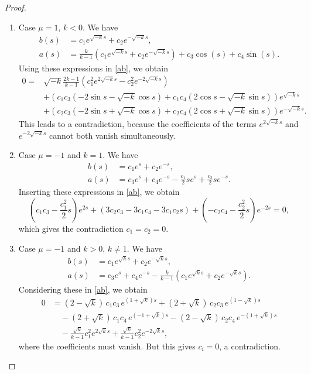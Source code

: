 \documentclass[10pt,a4paper]{amsart}
\begin{document}
\begin{proof}
\begin{enumerate}
\begin{enumerate}
\begin{enumerate}
\item Case $\mu=1$, $k <0$. We have 
\begin{equation*}
\begin{split}
b(s)&=c_1e^{\sqrt{-k}s}+c_2 e^{-\sqrt{-k}s},\\ 
a(s)&=\frac{k }{k-1}(c_1 e^{\sqrt{-k} s}+c_2 e^{-\sqrt{-k} s})+c_3 \cos (s)+c_4 \sin (s).
\end{split}
\end{equation*}
Using these expressions in \eqref{ab}, we obtain 
$$
\begin{aligned}
0=&
\sqrt{-k}\frac{2k-1}{k-1}( c_1^{2} e^{2\sqrt{-k}s}-c_2^{2} e^{-2\sqrt{-k}s}) \\
&+(c_1c_3(-2\sin s - \sqrt{-k}\cos s)+c_1c_4(2\cos s - \sqrt{-k}\sin s)) e^{\sqrt{-k}s} \\
&+(c_2c_3(-2\sin s +\sqrt{-k}\cos s)+c_2c_4(2\cos s + \sqrt{-k}\sin s))e^{-\sqrt{-k}s}.
\end{aligned}
$$
This leads to a contradiction, because the coefficients of the terms $e^{2\sqrt{-k}s}$ and $e^{-2\sqrt{-k}s}$ cannot both vanish simultaneously.

\item Case $\mu=-1$ and $k=1$. We have 
\begin{equation*}
\begin{split}
b(s)&=c_1e^s+c_2 e^{-s},\\
a(s) &= c_3 e^s + c_4  e^{-s} - \frac{c_1}{2} s e^s + \frac{c_2}{2} s e^{-s}.
\end{split}
\end{equation*}
Inserting these expressions in \eqref{ab}, we obtain
$$
(c_1 c_3 - \frac{c_1^2}{2}  s ) e^{2s}
+( 3c_2 c_3 - 3c_1 c_4 - 3c_1 c_2 s )
+ ( -c_2 c_4 - \frac{c_2^2}{2}  s ) e^{-2s}=0,
$$
which gives the contradiction $c_1=c_2=0$.

\item Case $\mu=-1$ and $k>0$, $k\neq 1$. We have
\begin{equation*}
\begin{split}
b(s)&=c_1e^{\sqrt{k}s}+c_2 e^{-{\sqrt{k}s}},\\
a(s)&= c_3e^{s} + c_4e^{-s}- \frac{k}{k-1}( c_1e^{\sqrt{k}s} + c_2e^{-\sqrt{k}s} ).
\end{split}
\end{equation*}
Considering these in \eqref{ab}, we obtain
$$
\begin{aligned}
0 &= (2 - \sqrt{k})\,c_1 c_3\, e^{(1+\sqrt{k})s}
+ (2 + \sqrt{k})\,c_2 c_3\, e^{(1-\sqrt{k})s} \\
&\quad - (2 + \sqrt{k})\,c_1 c_4\, e^{(-1+\sqrt{k})s}
- (2 - \sqrt{k})\,c_2 c_4\, e^{-(1+\sqrt{k})s} \\
&\quad - \frac{\sqrt{k}}{k-1} c_1^2 e^{2\sqrt{k} s}
+ \frac{\sqrt{k}}{k-1} c_2^2 e^{-2\sqrt{k} s},
\end{aligned}
$$
where the coefficients must vanish. But this gives  $c_i = 0$, a contradiction.


\end{enumerate}
\end{enumerate}
\end{enumerate}
\end{proof}
\end{document}
